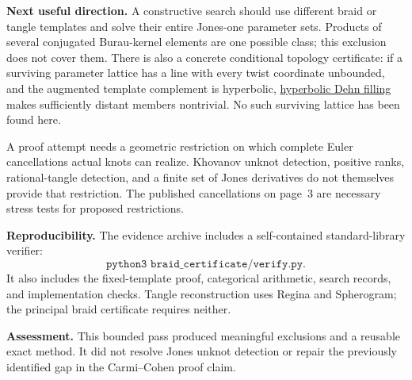 \documentclass[11pt]{article}
\begin{document}
\textbf{Next useful direction.}
A constructive search should use different braid or tangle templates and solve their entire Jones-one parameter sets. Products of several conjugated Burau-kernel elements are one possible class; this exclusion does not cover them. There is also a concrete conditional topology certificate: if a surviving parameter lattice has a line with every twist coordinate unbounded, and the augmented template complement is hyperbolic, \href{https://annals.math.princeton.edu/2005/162-1/p06}{hyperbolic Dehn filling} makes sufficiently distant members nontrivial. No such surviving lattice has been found here.

A proof attempt needs a geometric restriction on which complete Euler cancellations actual knots can realize. Khovanov unknot detection, positive ranks, rational-tangle detection, and a finite set of Jones derivatives do not themselves provide that restriction. The published cancellations on page~3 are necessary stress tests for proposed restrictions.

\textbf{Reproducibility.}
The evidence archive includes a self-contained standard-library verifier:
\[
\texttt{python3 braid\_certificate/verify.py}.
\]
It also includes the fixed-template proof, categorical arithmetic, search records, and implementation checks. Tangle reconstruction uses Regina and Spherogram; the principal braid certificate requires neither.

\textbf{Assessment.}
This bounded pass produced meaningful exclusions and a reusable exact method. It did not resolve Jones unknot detection or repair the previously identified gap in the Carmi--Cohen proof claim.
\end{document}

